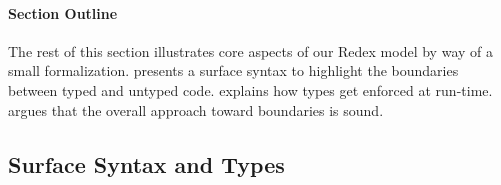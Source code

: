 \documentclass[english,cleveref,submission]{programming}
\begin{document}

\paragraph{Section Outline}

The rest of this section illustrates core aspects of our Redex model by way of
a small formalization.
 presents a surface syntax to highlight the boundaries between
typed and untyped code.
 explains how types get enforced at run-time.
 argues that the overall approach toward boundaries is sound.


\subsection{Surface Syntax and Types}
\label{s:surface}
\end{document}
